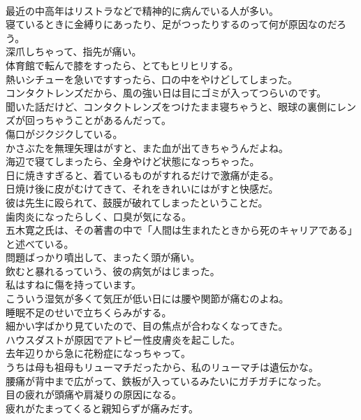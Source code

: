 \documentclass[8pt]{extreport}
\begin{document}
\begin{CJK}{UTF8}{min}
\\	最近の中高年はリストラなどで精神的に病んでいる人が多い。	
\\	寝ているときに金縛りにあったり、足がつったりするのって何が原因なのだろう。	
\\	深爪しちゃって、指先が痛い。	
\\	体育館で転んで膝をすったら、とてもヒリヒリする。	
\\	熱いシチューを急いですすったら、口の中をやけどしてしまった。	
\\	コンタクトレンズだから、風の強い日は目にゴミが入ってつらいのです。	
\\	聞いた話だけど、コンタクトレンズをつけたまま寝ちゃうと、眼球の裏側にレンズが回っちゃうことがあるんだって。	
\\	傷口がジクジクしている。	
\\	かさぶたを無理矢理はがすと、また血が出てきちゃうんだよね。	
\\	海辺で寝てしまったら、全身やけど状態になっちゃった。	
\\	日に焼きすぎると、着ているものがすれるだけで激痛が走る。	
\\	日焼け後に皮がむけてきて、それをきれいにはがすと快感だ。	
\\	彼は先生に殴られて、鼓膜が破れてしまったということだ。	
\\	歯肉炎になったらしく、口臭が気になる。	
\\	五木寛之氏は、その著書の中で「人間は生まれたときから死のキャリアである」と述べている。	
\\	問題ばっかり噴出して、まったく頭が痛い。	
\\	飲むと暴れるっていう、彼の病気がはじまった。	
\\	私はすねに傷を持っています。	
\\	こういう湿気が多くて気圧が低い日には腰や関節が痛むのよね。	
\\	睡眠不足のせいで立ちくらみがする。	
\\	細かい字ばかり見ていたので、目の焦点が合わなくなってきた。	
\\	ハウスダストが原因でアトピー性皮膚炎を起こした。	
\\	去年辺りから急に花粉症になっちゃって。	
\\	うちは母も祖母もリューマチだったから、私のリューマチは遺伝かな。	
\\	腰痛が背中まで広がって、鉄板が入っているみたいにガチガチになった。	
\\	目の疲れが頭痛や肩凝りの原因になる。	
\\	疲れがたまってくると親知らずが痛みだす。	

\end{CJK}
\end{document}
